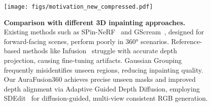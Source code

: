 \begin{figure}[t]
    \centering
    \texttt{[image: figs/motivation\_new\_compressed.pdf]}
    \vspace{-6mm}
    \caption{
    \textbf{Comparison with different 3D inpainting approaches.} Existing methods such as SPin-NeRF~\cite{spinnerf} and GScream~\cite{wang2024gscream}, designed for forward-facing scenes, perform poorly in 360° scenarios. Reference-based methods like Infusion~\cite{liu2024infusion} struggle with accurate depth projection, causing fine-tuning artifacts. Gaussian Grouping~\cite{ye2023gaussian} frequently misidentifies unseen regions, reducing inpainting quality. Our AuraFusion360 achieves precise unseen masks and improved depth alignment via Adaptive Guided Depth Diffusion, employing SDEdit~\cite{meng2022sdedit} for diffusion-guided, multi-view consistent RGB generation.
    }
    \vspace{-1mm}
    \label{fig:motivation}
\end{figure}

